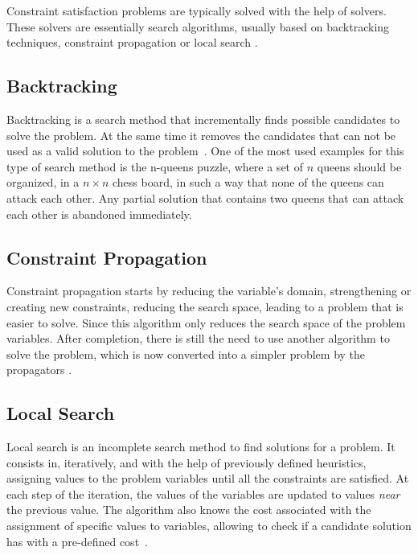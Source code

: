 Constraint satisfaction problems are typically solved with the help of solvers. These solvers are essentially search algorithms, usually based on backtracking techniques\cite{Knuth1997}, constraint propagation \cite{Lecoutre2010} or local search \cite{Dechter2003}. 

\subsection{Backtracking}

Backtracking is a search method that incrementally finds possible candidates to solve the problem. At the same time it removes the candidates that can not be used as a valid solution to the problem~\cite{Knuth1997}. One of the most used examples for this type of search method is the n-queens puzzle, where a set of $n$ queens should be organized, in a $n \times n$ chess board, in such a way that none of the queens can attack each other. Any partial solution that contains two queens that can attack each other is abandoned immediately.

\subsection{Constraint Propagation}

Constraint propagation starts by reducing the variable's domain, strengthening or creating new constraints, reducing the search space, leading to a problem that is easier to solve. Since this algorithm only reduces the search space of the problem variables. After completion, there is still the need to use another algorithm to solve the problem, which is now converted into a simpler problem by the propagators \cite{Lecoutre2010}. 

\subsection{Local Search}

Local search is an incomplete search method to find solutions for a problem. It consists in, iteratively, and with the help of previously defined heuristics, assigning values to the problem variables until all the constraints are satisfied. At each step of the iteration, the values of the variables are updated to values \emph{near} the previous value. The algorithm also knows the cost associated with the assignment of specific values to variables, allowing to check if a candidate solution has with a pre-defined cost~\cite{Dechter2003}.

